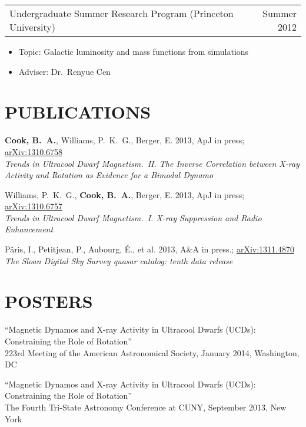 \documentclass[margin]{res}
\begin{document}
\begin{resume}
\begin{itemize}
				 \end{itemize}
				 \begin{tabular}{@{}p{4in} r}
				 Undergraduate Summer Research Program
                                 (Princeton University) & Summer 2012
				 \end{tabular}
				 \begin{itemize} \itemsep -2pt
				 \item[] Topic: Galactic luminosity
                                   and mass functions from simulations
				 \item[] Adviser: Dr.~Renyue Cen
				 \end{itemize}

\section{PUBLICATIONS}

\textbf{Cook, B.~A.}, Williams, P.~K.~G., Berger, E. 2013,
ApJ in press; \href{http://arxiv.org/abs/1310.6758}{arXiv:1310.6758}\\ \textit{Trends in Ultracool
  Dwarf Magnetism.~II. The Inverse Correlation between X-ray Activity
  and Rotation as Evidence for a Bimodal Dynamo}

Williams, P.~K.~G., \textbf{Cook, B.~A.}, Berger, E. 2013,
ApJ in press; \href{http://arxiv.org/abs/1310.6757}{arXiv:1310.6757}\\ \textit{Trends in Ultracool
  Dwarf Magnetism.~I. X-ray Suppression and Radio Enhancement}

P\^{a}ris, I., Petitjean, P., Aubourg, \'E., et al. 2013, A\&A in
press.; \href{http://arxiv.org/abs/1311.4870}{arXiv:1311.4870}\\ \textit{The Sloan Digital Sky Survey quasar catalog: tenth
  data release}

\section{POSTERS}

``Magnetic Dynamos and X-ray Activity in Ultracool Dwarfs (UCDs):
Constraining the Role of Rotation''\\ 223rd Meeting of the American
Astronomical Society, January 2014, Washington, DC

``Magnetic Dynamos and X-ray Activity in Ultracool Dwarfs (UCDs):
Constraining the Role of Rotation''\\ The Fourth Tri-State Astronomy
Conference at CUNY, September 2013, New York


\end{resume} 
\end{document}
